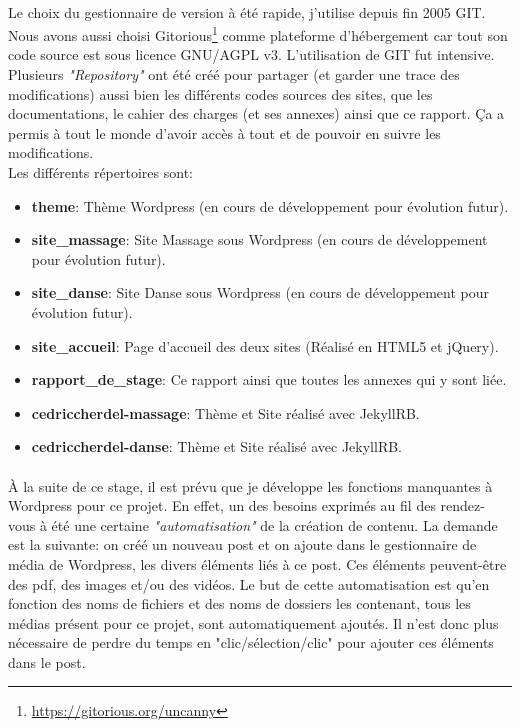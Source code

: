 \documentclass[11pt,a4paper,twoside]{report}
\begin{document}
			\paragraph*{}Le choix du gestionnaire de version à été rapide, j'utilise depuis fin 2005 GIT. Nous avons aussi choisi Gitorious\footnote{\url{https://gitorious.org/uncanny}} comme plateforme d'hébergement car tout son code source est sous licence GNU/AGPL v3. L'utilisation de GIT fut intensive. Plusieurs \textit{"Repository"} ont été créé pour partager (et garder une trace des modifications) aussi bien les différents codes sources des sites, que les documentations, le cahier des charges (et ses annexes) ainsi que ce rapport. Ça a permis à tout le monde d'avoir accès à tout et de pouvoir en suivre les modifications.\\
			Les différents répertoires sont:
				\begin{itemize}
					\item \textbf{theme}: Thème Wordpress (en cours de développement pour évolution futur).
					\item \textbf{site\_massage}: Site Massage sous Wordpress (en cours de développement pour évolution futur).
					\item \textbf{site\_danse}: Site Danse sous Wordpress (en cours de développement pour évolution futur).
					\item \textbf{site\_accueil}: Page d'accueil des deux sites (Réalisé en HTML5 et jQuery).
					\item \textbf{rapport\_de\_stage}: Ce rapport ainsi que toutes les annexes qui y sont liée.
					\item \textbf{cedriccherdel-massage}: Thème et Site réalisé avec JekyllRB.
					\item \textbf{cedriccherdel-danse}: Thème et Site réalisé avec JekyllRB.
				\end{itemize}
			\paragraph*{}À la suite de ce stage, il est prévu que je développe les fonctions manquantes à Wordpress pour ce projet. En effet, un des besoins exprimés au fil des rendez-vous à été une certaine \textit{"automatisation"} de la création de contenu. La demande est la suivante: on créé un nouveau post et on ajoute dans le gestionnaire de média de Wordpress, les divers éléments liés à ce post. Ces éléments peuvent-être des pdf, des images et/ou des vidéos. Le but de cette automatisation est qu'en fonction des noms de fichiers et des noms de dossiers les contenant, tous les médias présent pour ce projet, sont automatiquement ajoutés. Il n'est donc plus nécessaire de perdre du temps en "clic/sélection/clic" pour ajouter ces éléments dans le post.
\end{document}
